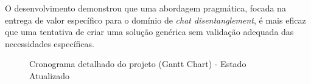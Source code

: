 O desenvolvimento demonstrou que uma abordagem pragmática, focada na entrega de valor específico para o domínio de \textit{chat disentanglement}, é mais eficaz que uma tentativa de criar uma solução genérica sem validação adequada das necessidades específicas.

\begin{landscape}
    \begin{figure}[p]
        \centering
        \caption{Cronograma detalhado do projeto (Gantt Chart) - Estado Atualizado}
        \label{fig:gantt-chart}
    \end{figure}
\end{landscape}
